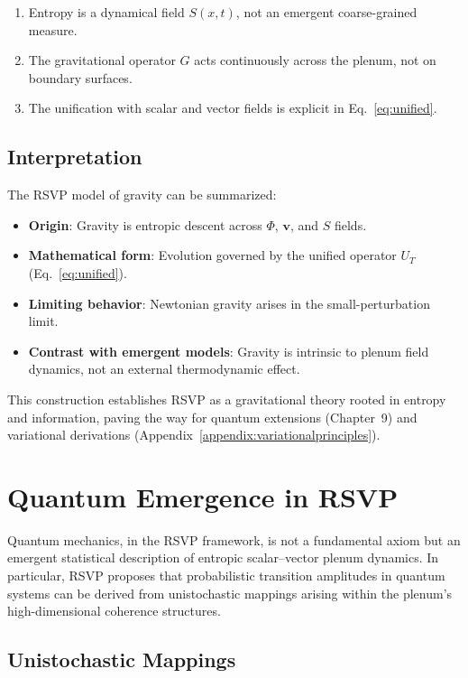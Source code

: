 \documentclass[12pt]{report}
\begin{document}
\begin{enumerate}
    \item Entropy is a dynamical field $S(x,t)$, not an emergent coarse-grained measure.
    \item The gravitational operator $G$ acts continuously across the plenum, not on boundary surfaces.
    \item The unification with scalar and vector fields is explicit in Eq.~\eqref{eq:unified}.
\end{enumerate}

\section{Interpretation}

The RSVP model of gravity can be summarized:

\begin{itemize}
    \item \textbf{Origin}: Gravity is entropic descent across $\Phi$, $\mathbf{v}$, and $S$ fields.
    \item \textbf{Mathematical form}: Evolution governed by the unified operator $U_T$ (Eq.~\ref{eq:unified}).
    \item \textbf{Limiting behavior}: Newtonian gravity arises in the small-perturbation limit.
    \item \textbf{Contrast with emergent models}: Gravity is intrinsic to plenum field dynamics, not an external thermodynamic effect.
\end{itemize}

This construction establishes RSVP as a gravitational theory rooted in entropy and information, paving the way for quantum extensions (Chapter~9) and variational derivations (Appendix~\ref{appendix:variationalprinciples}).


\chapter{Quantum Emergence in RSVP}

Quantum mechanics, in the RSVP framework, is not a fundamental axiom but an emergent statistical description of entropic scalar--vector plenum dynamics.  
In particular, RSVP proposes that probabilistic transition amplitudes in quantum systems can be derived from unistochastic mappings arising within the plenum’s high-dimensional coherence structures.

\section{Unistochastic Mappings}
\end{document}
